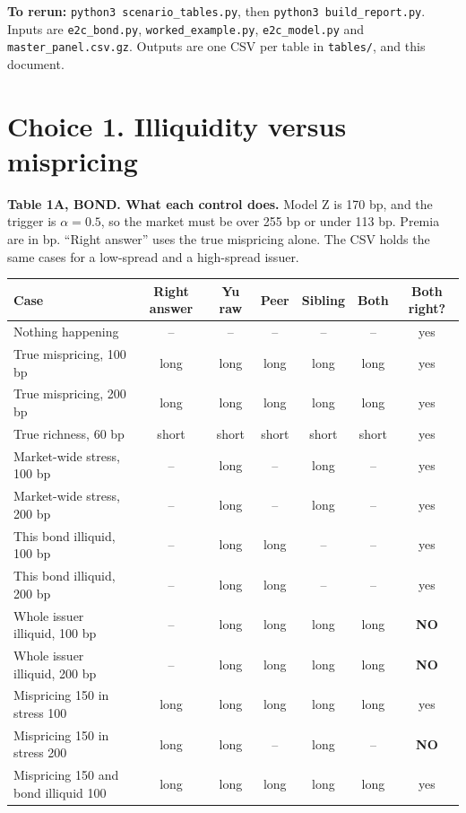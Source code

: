 \documentclass[10pt,a4paper]{article}
\begin{document}
\textbf{To rerun:} \texttt{python3 scenario\_tables.py}, then \texttt{python3 build\_report.py}. Inputs are \texttt{e2c\_bond.py}, \texttt{worked\_example.py}, \texttt{e2c\_model.py} and \texttt{master\_panel.csv.gz}. Outputs are one CSV per table in \texttt{tables/}, and this document.

\section*{Choice 1. Illiquidity versus mispricing}
\textbf{Table 1A, BOND. What each control does.} Model Z is 170 bp, and the trigger is $\alpha=0.5$, so the market must be over 255 bp or under 113 bp. Premia are in bp. ``Right answer'' uses the true mispricing alone. The CSV holds the same cases for a low-spread and a high-spread issuer.
{\small
\begin{center}\begin{tabular}{lcccccc}\toprule
Case & Right answer & Yu raw & Peer & Sibling & Both & Both right? \\ \midrule
Nothing happening & -- & -- & -- & -- & -- & yes \\
True mispricing, 100 bp & long & long & long & long & long & yes \\
True mispricing, 200 bp & long & long & long & long & long & yes \\
True richness, 60 bp & short & short & short & short & short & yes \\
Market-wide stress, 100 bp & -- & long & -- & long & -- & yes \\
Market-wide stress, 200 bp & -- & long & -- & long & -- & yes \\
This bond illiquid, 100 bp & -- & long & long & -- & -- & yes \\
This bond illiquid, 200 bp & -- & long & long & -- & -- & yes \\
Whole issuer illiquid, 100 bp & -- & long & long & long & long & \textbf{NO} \\
Whole issuer illiquid, 200 bp & -- & long & long & long & long & \textbf{NO} \\
Mispricing 150 in stress 100 & long & long & long & long & long & yes \\
Mispricing 150 in stress 200 & long & long & -- & long & -- & \textbf{NO} \\
Mispricing 150 and bond illiquid 100 & long & long & long & long & long & yes \\
\bottomrule\end{tabular}\end{center}}
\end{document}
